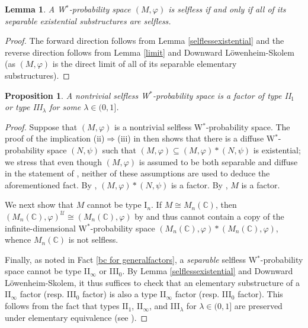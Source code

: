 \documentclass[12pt]{amsart}
\newtheorem{lem}[thm]{Lemma}
\newtheorem{prop}[thm]{Proposition}
\theoremstyle{definition}
\def\bb{\mathbb}
\def\bb{\mathbb}
\def\u{\mathsf 1}
\def \u{\mathcal U}
\begin{document}
\begin{lem}\label{separableenoughselfless}
A W$^*$-probability space $(M,\varphi)$ is selfless if and only if all of its separable existential substructures are selfless.
\end{lem}

\begin{proof}
The forward direction follows from Lemma \ref{selflessexistential} and the reverse direction follows from Lemma \ref{limit} and Downward L\"owenheim-Skolem (as $(M,\varphi)$ is the direct limit of all of its separable elementary substructures).
\end{proof}

\begin{prop}\label{selflessfactor}
A nontrivial selfless W$^*$-probability space is a factor of type II$_1$ or type III$_\lambda$ for some $\lambda\in (0,1]$.
\end{prop}

\begin{proof}
Suppose that $(M,\varphi)$ is a nontrivial selfless W$^*$-probability space.  The proof of the implication (ii)$\Rightarrow$(iii) in \cite[Theorem A]{cyrilamine} then shows that there is a diffuse W$^*$-probability space $(N,\psi)$ such that $(M,\varphi)\subseteq (M,\varphi)*(N,\psi)$ is existential; we stress that even though $(M,\varphi)$ is assumed to be both separable and diffuse in the statement of \cite[Theorem A]{cyrilamine}, neither of these assumptions are used to deduce the aforementioned fact.  By \cite[Theorem 3.4]{ueda2011factoriality}, $(M,\varphi)*(N,\psi)$ is a factor.  By \cite[Lemma 3.3]{goldbringhoudayer}, $M$ is a factor.

We next show that $M$ cannot be type I$_n$.  If $M\cong M_n(\bb C)$, then $(M_n(\bb C),\varphi)^\u\cong (M_n(\bb C),\varphi)$ by \cite[Lemma 2.8]{MT16Rohlin} and thus cannot contain a copy of the infinite-dimensional W$^*$-probability space $(M_n(\bb C),\varphi)*(M_n(\bb C),\varphi)$, whence $M_n(\bb C)$ is not selfless.

Finally, as noted in Fact \ref{bc for generalfactors}, a \emph{separable} selfless W$^*$-probability space cannot be type II$_\infty$ or III$_0$.  By Lemma \ref{selflessexistential} and Downward L\"owenheim-Skolem, it thus suffices to check that an elementary substructure of a II$_\infty$ factor (resp. III$_0$ factor) is also a type II$_\infty$ factor (resp. III$_0$ factor).  This follows from the fact that types II$_1$, II$_\infty$, and III$_\lambda$ for $\lambda\in (0,1]$ are preserved under elementary equivalence (see \cite[Propositions 8.7 and 8.8]{AGHS25}).  
\end{proof}
\end{document}
